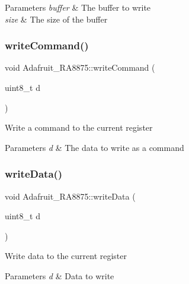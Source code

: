 \begin{DoxyParams}{Parameters}
{\em buffer} & The buffer to write \\
\hline
{\em size} & The size of the buffer \\
\hline
\end{DoxyParams}
\mbox{\label{class_adafruit___r_a8875_a65c88e13691db0d8cae5b5e32883268e}} 
\subsubsection{\texorpdfstring{writeCommand()}{writeCommand()}}
{\footnotesize\ttfamily void Adafruit\+\_\+\+R\+A8875\+::write\+Command (\begin{DoxyParamCaption}\item[{uint8\+\_\+t}]{d }\end{DoxyParamCaption})}

Write a command to the current register


\begin{DoxyParams}{Parameters}
{\em d} & The data to write as a command \\
\hline
\end{DoxyParams}
\mbox{\label{class_adafruit___r_a8875_ada2fe2eaba6203691b422c0f561c8a94}} 
\subsubsection{\texorpdfstring{writeData()}{writeData()}}
{\footnotesize\ttfamily void Adafruit\+\_\+\+R\+A8875\+::write\+Data (\begin{DoxyParamCaption}\item[{uint8\+\_\+t}]{d }\end{DoxyParamCaption})}

Write data to the current register


\begin{DoxyParams}{Parameters}
{\em d} & Data to write \\
\hline
\end{DoxyParams}
\mbox{\label{class_adafruit___r_a8875_a2e6a3f2fd43716ddb5c279e0a456369f}} 
